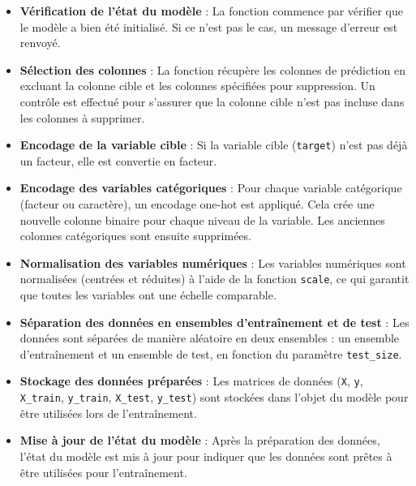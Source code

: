 \documentclass{rapport}
\begin{document}
\begin{itemize}
    \item \textbf{Vérification de l'état du modèle} : 
    La fonction commence par vérifier que le modèle a bien été initialisé. Si ce n'est pas le cas, un message d'erreur est renvoyé.
    
    \item \textbf{Sélection des colonnes} : 
    La fonction récupère les colonnes de prédiction en excluant la colonne cible et les colonnes spécifiées pour suppression. Un contrôle est effectué pour s'assurer que la colonne cible n'est pas incluse dans les colonnes à supprimer.
    
    \item \textbf{Encodage de la variable cible} : 
    Si la variable cible (\texttt{target}) n'est pas déjà un facteur, elle est convertie en facteur. 
    
    \item \textbf{Encodage des variables catégoriques} : 
    Pour chaque variable catégorique (facteur ou caractère), un encodage one-hot est appliqué. Cela crée une nouvelle colonne binaire pour chaque niveau de la variable. Les anciennes colonnes catégoriques sont ensuite supprimées.
    
    \item \textbf{Normalisation des variables numériques} : 
    Les variables numériques sont normalisées (centrées et réduites) à l'aide de la fonction \texttt{scale}, ce qui garantit que toutes les variables ont une échelle comparable.
    
    \item \textbf{Séparation des données en ensembles d'entraînement et de test} : 
    Les données sont séparées de manière aléatoire en deux ensembles : un ensemble d'entraînement et un ensemble de test, en fonction du paramètre \texttt{test\_size}. 
    
    \item \textbf{Stockage des données préparées} : 
    Les matrices de données (\texttt{X}, \texttt{y}, \texttt{X\_train}, \texttt{y\_train}, \texttt{X\_test}, \texttt{y\_test}) sont stockées dans l'objet du modèle pour être utilisées lors de l'entraînement.
    
    \item \textbf{Mise à jour de l'état du modèle} : 
    Après la préparation des données, l'état du modèle est mis à jour pour indiquer que les données sont prêtes à être utilisées pour l'entraînement.
\end{itemize}
\end{document}
